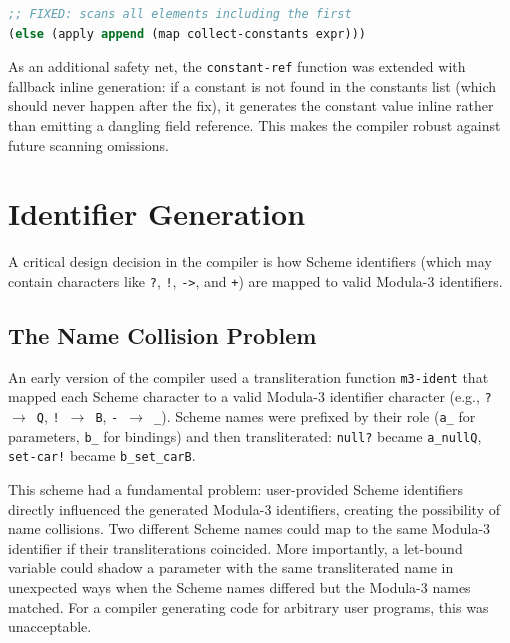 \documentclass[12pt]{report}
\begin{document}
\begin{lstlisting}[language=Scheme]
;; FIXED: scans all elements including the first
(else (apply append (map collect-constants expr)))
\end{lstlisting}

As an additional safety net, the \texttt{constant-ref} function was
extended with fallback inline generation: if a constant is not found
in the constants list (which should never happen after the fix), it
generates the constant value inline rather than emitting a dangling
field reference.  This makes the compiler robust against future
scanning omissions.

\section{Identifier Generation}
\label{sec:impl-idents}

A critical design decision in the compiler is how Scheme identifiers
(which may contain characters like \texttt{?}, \texttt{!}, \texttt{->},
and \texttt{+}) are mapped to valid Modula-3 identifiers.

\subsection{The Name Collision Problem}

An early version of the compiler used a transliteration function
\texttt{m3-ident} that mapped each Scheme character to a valid
Modula-3 identifier character (e.g., \texttt{?}~$\to$~\texttt{Q},
\texttt{!}~$\to$~\texttt{B}, \texttt{-}~$\to$~\texttt{\_}).
Scheme names were prefixed by their role (\texttt{a\_} for
parameters, \texttt{b\_} for bindings) and then transliterated:
\texttt{null?} became \texttt{a\_nullQ}, \texttt{set-car!} became
\texttt{b\_set\_carB}.

This scheme had a fundamental problem: user-provided Scheme
identifiers directly influenced the generated Modula-3 identifiers,
creating the possibility of name collisions.  Two different Scheme
names could map to the same Modula-3 identifier if their
transliterations coincided.  More importantly, a let-bound variable
could shadow a parameter with the same transliterated name in
unexpected ways when the Scheme names differed but the Modula-3
names matched.  For a compiler generating code for arbitrary user
programs, this was unacceptable.
\end{document}
